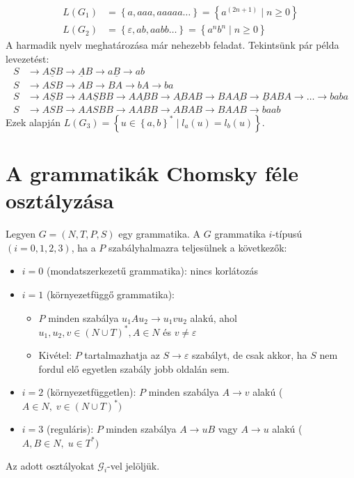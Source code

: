 \begin{solution}
	\begin{align*}
		L(G_1) &= \left\lbrace a, aaa, aaaaa \dots \right\rbrace = \left\lbrace a^{(2n+1)} \; | \; n \ge 0 \right\rbrace \\
		L(G_2) &= \left\lbrace \varepsilon, ab, aabb \dots \right\rbrace = \left\lbrace a^nb^n \; | \; n \ge 0 \right\rbrace
	\end{align*}
	A harmadik nyelv meghatározása már nehezebb feladat. Tekintsünk pár példa levezetést:
	\begin{align*}
		S &\rightarrow A\underline{S}B \rightarrow \underline{A}B \rightarrow a\underline{B} \rightarrow ab \\
		S &\rightarrow ASB \rightarrow AB \rightarrow BA \rightarrow bA \rightarrow ba \\
		S &\rightarrow A\underline{S}B \rightarrow AA\underline{S}BB \rightarrow A\underline{AB}B \rightarrow \underline{AB}AB \rightarrow BA\underline{AB} \rightarrow \underline{B}ABA \rightarrow \dots \rightarrow baba \\
		S &\rightarrow ASB \rightarrow AASBB \rightarrow AABB \rightarrow ABAB \rightarrow BAAB \rightarrow baab
	\end{align*}
	Ezek alapján $L(G_3) = \left\lbrace u \in \left\lbrace a,b \right\rbrace^* \; | \; l_a(u) = l_b(u) \right\rbrace $.
\end{solution}

\section{A grammatikák Chomsky féle osztályzása}
Legyen $ G = (N, T, P, S) $ egy grammatika. A $G$ grammatika $i$-típusú $ (i = 0,1,2,3) $, ha a $P$ szabályhalmazra teljesülnek a következők:
\begin{itemize}
	\item $ i = 0 $ (mondatszerkezetű grammatika): nincs korlátozás
	\item { $ i = 1 $ (környezetfüggő grammatika):
		\begin{itemize}
			\item $P$ minden szabálya $u_1Au_2 \rightarrow u_1vu_2 $ alakú, ahol $u_1, u_2, v \in (N \cup T)^*, A \in N $ és $ v \ne \varepsilon $
			\item Kivétel: $P$ tartalmazhatja az $ S \rightarrow \varepsilon $ szabályt, de csak akkor, ha $S$ nem fordul elő egyetlen szabály jobb oldalán sem.
		\end{itemize}
	}
	\item { $ i = 2 $ (környezetfüggetlen): $ P $ minden szabálya $A \rightarrow v $ alakú ($A \in N, \; v \in (N \cup T)^*) $
	}
	\item { $ i = 3 $ (reguláris): $ P $ minden szabálya $A \rightarrow uB $ vagy $A \rightarrow u $ alakú ($A,B \in N, \; u \in T^*) $
	}
\end{itemize}
Az adott osztályokat $\mathcal{G}_i$-vel jelöljük.


